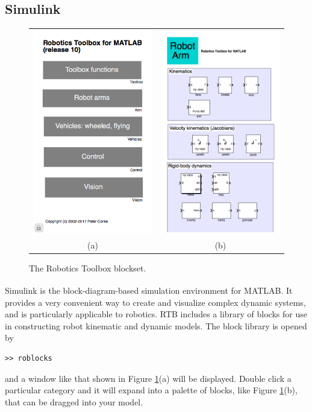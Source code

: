 \documentclass[a4paper,twoside]{report}
\begin{document}
\subsection{Simulink\textsuperscript{\textregistered}}
\begin{figure}
\begin{tabular}{cc}
\includegraphics[width=6cm]{figs/roblocks.png} & \includegraphics[width=6cm]{figs/roblocks2.png} \\
(a) & (b) 
\end{tabular}
\caption{The Robotics Toolbox blockset.}\label{fig:blockset}
\end{figure}


Simulink\textsuperscript{\textregistered} is the block-diagram-based simulation environment for MATLAB.
It provides a very convenient way to create and visualize complex dynamic
systems, and is particularly applicable to robotics.
RTB includes a library of blocks for use
in constructing robot kinematic and dynamic models.
The block library is opened by
\begin{verbatim}
>> roblocks
\end{verbatim}
and a window like that shown in Figure \ref{fig:blockset}(a) will be displayed.  Double click a particular category and it
will expand into a palette of blocks, like Figure \ref{fig:blockset}(b), that can be dragged into your model.
\end{document}

